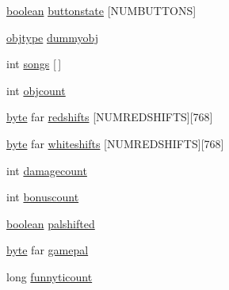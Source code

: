 \begin{DoxyCompactItemize}
\item 
\hyperlink{ID__HEAD_8H_a7c6368b321bd9acd0149b030bb8275ed}{boolean} \hyperlink{WL__PLAY_8C_a20a88de6f72f7a0d0ecae027aa6052d4}{buttonstate} \mbox{[}NUMBUTTONS\mbox{]}
\item 
\hyperlink{structobjstruct}{objtype} \hyperlink{WL__PLAY_8C_a0e5a8cf650979c9507f17a53423b62d0}{dummyobj}
\item 
int \hyperlink{WL__PLAY_8C_a4af95f8ed94849394a922f8dab8c1dd7}{songs} \mbox{[}$\,$\mbox{]}
\item 
int \hyperlink{WL__PLAY_8C_a9727f781b3f4cd2b8b28838f132ebb57}{objcount}
\item 
\hyperlink{ID__HEAD_8H_a0c8186d9b9b7880309c27230bbb5e69d}{byte} far \hyperlink{WL__PLAY_8C_a9662d2ac7202ad45530f94f43124fef1}{redshifts} \mbox{[}NUMREDSHIFTS\mbox{]}\mbox{[}768\mbox{]}
\item 
\hyperlink{ID__HEAD_8H_a0c8186d9b9b7880309c27230bbb5e69d}{byte} far \hyperlink{WL__PLAY_8C_a5b8536a1ac5c83ff0cbe8c01222ccb40}{whiteshifts} \mbox{[}NUMREDSHIFTS\mbox{]}\mbox{[}768\mbox{]}
\item 
int \hyperlink{WL__PLAY_8C_abaab1e8ae0a070c271e7872c6ec22667}{damagecount}
\item 
int \hyperlink{WL__PLAY_8C_a3b8983c4cb5a8c78246addd30658d896}{bonuscount}
\item 
\hyperlink{ID__HEAD_8H_a7c6368b321bd9acd0149b030bb8275ed}{boolean} \hyperlink{WL__PLAY_8C_a5201d2df7fa5b1e931f93a08277da76a}{palshifted}
\item 
\hyperlink{ID__HEAD_8H_a0c8186d9b9b7880309c27230bbb5e69d}{byte} far \hyperlink{WL__PLAY_8C_a72ce00e98a92644d4cbf41fb10a2f7ad}{gamepal}
\item 
long \hyperlink{WL__PLAY_8C_a04613e65e640f316854208a4fc7bdc02}{funnyticount}
\end{DoxyCompactItemize}


